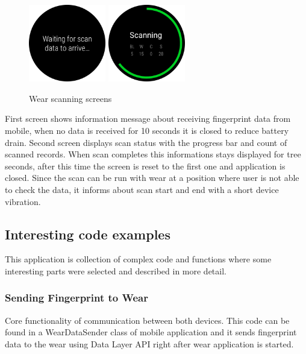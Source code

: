 \begin{figure}[H]
	\begin{centering}
		\includegraphics[width=0.3\textwidth]{img/wear_waiting_edited}
		\hspace{0.5cm}
		\includegraphics[width=0.3\textwidth]{img/wear_scanning_edited}
		\par\end{centering}
	\caption{Wear scanning screens}
	\label{fig09c05}
\end{figure}

First screen shows information message about receiving fingerprint data from mobile, when no data is received for 10 seconds it is closed to reduce battery drain. Second screen displays scan status with the progress bar and count of scanned records. When scan completes this informations stays displayed for tree seconds, after this time the screen is reset to the first one and application is closed. Since the scan can be run with wear at a position where user is not able to check the data, it informs about scan start and end with a short device vibration.

\subsection{Interesting code examples}\label{subsec:Interesting code examples}
This application is collection of complex code and functions where some interesting parts were selected and described in more detail.

\subsubsection{Sending Fingerprint to Wear}\label{subsubsec:SendingFingerprintToWear}
Core functionality of communication between both devices. This code can be found in a WearDataSender class of mobile application and it sends fingerprint data to the wear using Data Layer API right after wear application is started.

